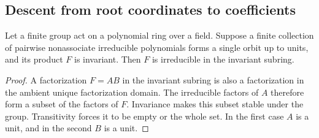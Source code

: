 \documentclass[11pt,letterpaper]{article}
\numberwithin{equation}{section}
\theoremstyle{definition}
\theoremstyle{remark}
\begin{document}
\subsection{Descent from root coordinates to coefficients}

\begin{lemma}
\label{sbr:lem:orbit-product}
Let a finite group act on a polynomial ring over a field. Suppose a finite
collection of pairwise nonassociate irreducible polynomials forms a single
orbit up to units, and its product $F$ is invariant. Then $F$ is
irreducible in the invariant subring.
\end{lemma}
\begin{proof}
A factorization $F=AB$ in the invariant subring is also a factorization in
the ambient unique factorization domain. The irreducible factors of $A$
therefore form a subset of the factors of $F$. Invariance makes this subset
stable under the group. Transitivity forces it to be empty or the whole
set. In the first case $A$ is a unit, and in the second $B$ is a unit.
\end{proof}
\end{document}

